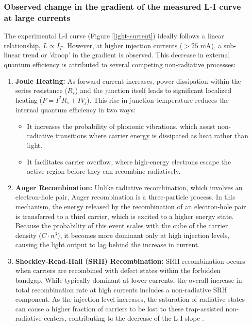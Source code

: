 \documentclass[1pt]{article}
\begin{document}
\subsubsection{Observed change in the gradient of the measured L-I curve at large currents}

The experimental L-I curve (Figure \ref{light-current}) ideally follows a linear relationship, $L \propto I_F$. However, at higher injection currents ($>25$ mA), a sub-linear trend or 'droop' in the gradient is observed. This decrease in external quantum efficiency is attributed to several competing non-radiative processes:

\begin{enumerate}
    \item \textbf{Joule Heating:} 
    As forward current increases, power dissipation within the series resistance ($R_s$) and the junction itself leads to significant localized heating ($P = I^2 R_s + IV_{j}$). This rise in junction temperature reduces the internal quantum efficiency in two ways:
    \begin{itemize}
        \item It increases the probability of phononic vibrations, which assist non-radiative transitions where carrier energy is dissipated as heat rather than light.
        \item It facilitates carrier overflow, where high-energy electrons escape the active region before they can recombine radiatively.
    \end{itemize}

    \item \textbf{Auger Recombination:} 
    Unlike radiative recombination, which involves an electron-hole pair, Auger recombination is a three-particle process. In this mechanism, the energy released by the recombination of an electron-hole pair is transferred to a third carrier, which is excited to a higher energy state. Because the probability of this event scales with the cube of the carrier density ($C \cdot n^3$), it becomes more dominant only at high injection levels, causing the light output to lag behind the increase in current.

    \item \textbf{Shockley-Read-Hall (SRH) Recombination:} 
    SRH recombination occurs when carriers are recombined with defect states within the forbidden bandgap. While typically dominant at lower currents, the overall increase in total recombination rate at high currents includes a non-radiative SRH component. As the injection level increases, the saturation of radiative states can cause a higher fraction of carriers to be lost to these trap-assisted non-radiative centers, contributing to the decrease of the L-I slope \cite{shockley-read-hall}.
\end{enumerate}
\end{document}
